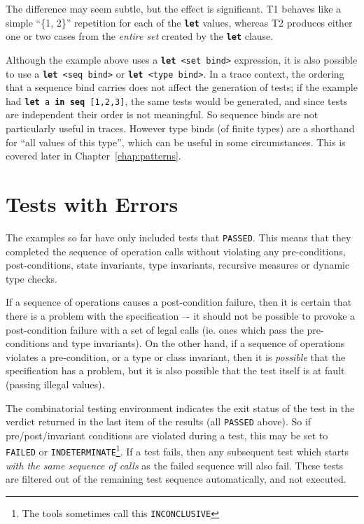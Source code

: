 \documentclass{overturerepchap}
\begin{document}
\noindent The difference may seem subtle, but the effect is significant. T1 behaves like a
simple ``\{1, 2\}'' repetition for each of the \texttt{\textbf{let}} values, whereas T2
produces either one or two cases from the \emph{entire set} created by the \texttt{\textbf{let}}
clause.

Although the example above uses a \texttt{\textbf{let} <set bind>} expression, it is also
possible to use a \texttt{\textbf{let} <seq bind>} or \texttt{\textbf{let} <type bind>}. In a
trace context, the ordering that a sequence bind carries does not affect the
generation of tests; if the example had \texttt{\textbf{let} a \textbf{in seq} [1,2,3]}, the
same tests would be generated, and since tests are independent their order is not
meaningful. So sequence binds are not particularly useful in traces. However
type binds (of finite types) are a shorthand for ``all values of this type'',
which can be useful in some circumstances. This is covered later in Chapter~\ref{chap:patterns}.

\section{Tests with Errors}

The examples so far have only included tests that \texttt{PASSED}. This means
that they completed the sequence of operation calls without violating any pre-conditions,
post-conditions, state invariants, type invariants, recursive measures or dynamic
type checks.

If a sequence of operations causes a post-condition failure, then it
is certain that there is a problem with the specification –- it should not be
possible to provoke a post-condition failure with a set of legal calls (ie. ones
which pass the pre-conditions and type invariants). On the other hand, if a 
sequence of operations violates a pre-condition, or a type or class invariant, 
then it is \emph{possible} that the specification has a problem, but it is also 
possible that the test itself is at fault (passing illegal values).

The combinatorial testing environment indicates the exit status of the test  in
the verdict returned in the last item of the results (all \texttt{PASSED} above). So if 
pre/post/invariant conditions are violated during a test, this may be set to 
\texttt{FAILED} or \texttt{INDETERMINATE}\footnote{The tools sometimes call this \texttt{INCONCLUSIVE}}. If
a test fails, then any subsequent test which starts \emph{with the same
sequence of calls} as the failed sequence will also fail. These tests are
filtered out of the remaining test sequence automatically, and not executed.
\end{document}
